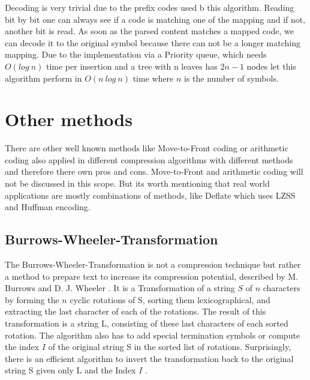 \par{
Decoding is very trivial due to the prefix codes used b this algorithm. Reading bit by bit one can always see if a code is matching one of the mapping and if not, another bit is read. As soon as the parsed content matches a mapped code, we can decode it to the original symbol because there can not be a longer matching mapping. Due to the implementation via a Priority queue, which needs $O(log \: n)$ time per insertion and a tree with n leaves has $2n-1$ nodes let this algorithm perform in $O(n \: log \: n)$ time where $n$ is the number of symbols.
}

\section{Other methods}
\label{ch:Principles of compression:sec:Other}
\par{
There are other well known methods like Move-to-Front coding or arithmetic coding also applied in different compression algorithms with different methods and therefore there own pros and cons. Move-to-Front and arithmetic coding will not be discussed in this scope. But its worth mentioning that real world applications are mostly combinations of methods, like Deflate\cite{deutsch1996rfc1951} which uses LZSS\cite{10.1145/322344.322346} and Huffman encoding.  
}

\subsection{Burrows-Wheeler-Transformation}
\label{ch:Principles of compression:sec:Other:subSec:bwt}

\par{
The Burrows-Wheeler-Transformation is not a compression technique but rather a method to prepare text to increase its compression potential, described by M. Burrows and D. J. Wheeler \cite{Burrows94}. It is a Transformation of a string $S$ of $n$ characters by forming the $n$ cyclic rotations of S, sorting them lexicographical, and extracting the last character of each of the rotations. The result of this transformation is a string L, consisting of these last characters of each sorted rotation. The algorithm also has to add special termination symbols or compute the index $I$ of the original string S in the sorted list of rotations. Surprisingly, there is an efficient algorithm to invert the transformation back to the original string S given only L and the Index $I$ \cite{Burrows-linear-time}.
}

